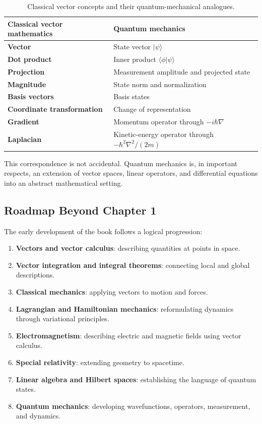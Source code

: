 \begin{table}[htbp]
\centering
\caption{Classical vector concepts and their quantum-mechanical analogues.}
\label{tab:classical-quantum-correspondence}
\begin{tabularx}{0.94\textwidth}{@{}>{\bfseries}p{}X@{}}
\toprule
Classical vector mathematics & Quantum mechanics \\
\midrule
Vector & State vector $|\psi\rangle$ \\
Dot product & Inner product $\langle\phi|\psi\rangle$ \\
Projection & Measurement amplitude and projected state \\
Magnitude & State norm and normalization \\
Basis vectors & Basis states \\
Coordinate transformation & Change of representation \\
Gradient & Momentum operator through $-i\hbar\nabla$ \\
Laplacian & Kinetic-energy operator through $-\hbar^2\nabla^2/(2m)$ \\
\bottomrule
\end{tabularx}
\end{table}

This correspondence is not accidental. Quantum mechanics is, in important
respects, an extension of vector spaces, linear operators, and differential
equations into an abstract mathematical setting.

\subsection{Roadmap Beyond Chapter 1}

The early development of the book follows a logical progression:

\begin{enumerate}
\item \textbf{Vectors and vector calculus}: describing quantities at points in
space.
\item \textbf{Vector integration and integral theorems}: connecting local and
global descriptions.
\item \textbf{Classical mechanics}: applying vectors to motion and forces.
\item \textbf{Lagrangian and Hamiltonian mechanics}: reformulating dynamics
through variational principles.
\item \textbf{Electromagnetism}: describing electric and magnetic fields using
vector calculus.
\item \textbf{Special relativity}: extending geometry to spacetime.
\item \textbf{Linear algebra and Hilbert spaces}: establishing the language of
quantum states.
\item \textbf{Quantum mechanics}: developing wavefunctions, operators,
measurement, and dynamics.
\end{enumerate}

